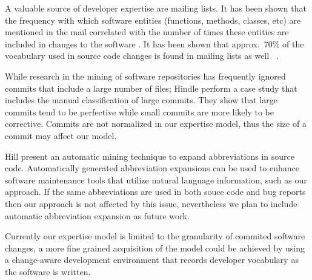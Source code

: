 
A valuable source of developer expertise are mailing lists. It has been shown that the frequency with which software entities (functions, methods, classes, etc) are mentioned in the mail correlated with the number of times these entities are included in changes to the software \cite{Patt08a}. It has been shown that approx.\ 70\% of the vocabulary used in source code changes is found in mailing lists as well~ \cite{Bays07a}.


 While research in the mining of software repositories has frequently ignored commits that include a large number of files; 
Hindle \etal \cite{Hind08b} perform a case study that includes the manual classification of large commits. They show that large commits tend to be perfective while small commits are more likely to be corrective. Commits are not normalized in our expertise model, thus the size of a commit may affect our model. 


Hill \etal \cite{Hill08a} present an automatic mining technique to expand abbreviations in source code.  Automatically generated abbreviation expansions can be used to enhance software maintenance tools that utilize natural language information, such as our approach. If the same abbreviations are used in both souce code and bug reports then our approach is not affected by this issue, nevertheless we plan to include  automatic abbreviation expansion as future work.

Currently our expertise model is limited to the granularity of commited software changes, a more fine grained acquisition of the model could be achieved by using a change-aware development environment \cite{Omor08a,Robb08a} that records developer vocabulary as the software is written.  

